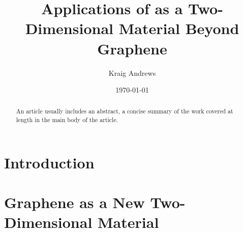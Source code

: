 \documentclass[%
 reprint,
 amsmath,amssymb,
 aps,
pra,
]{revtex4-1}
\begin{document}

\title{Applications of  as a Two-Dimensional Material Beyond Graphene}%

\author{Kraig Andrews}%
%




\date{\today}%

\begin{abstract}
An article usually includes an abstract, a concise summary of the work
covered at length in the main body of the article. 
\end{abstract}

\maketitle


\section{\label{sec:introduction} Introduction}

\section{\label{sec:graphene_properties} Graphene as a New Two-Dimensional Material}
\end{document}
